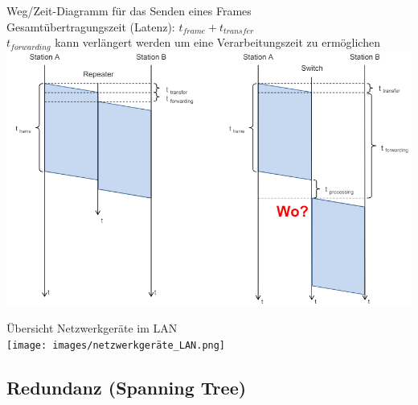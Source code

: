 \begin{KR}{Weg/Zeit-Diagramm für das Senden eines Frames}\\
    Gesamtübertragungszeit (Latenz): $t_{frame} + t_{transfer}$\\
    $t_{forwarding}$ kann verlängert werden um eine Verarbeitungszeit zu ermöglichen\\
        \includegraphics[width=1\linewidth]{images/weg_zeit_senden_frame.png}
\end{KR}

\begin{definition}{Übersicht Netzwerkgeräte im LAN}\\
        \texttt{[image: images/netzwerkgeräte\_LAN.png]}
\end{definition}

\subsection{Redundanz (Spanning Tree)}

